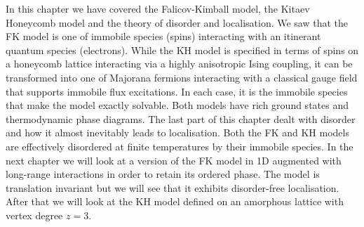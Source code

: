 In this chapter we have covered the Falicov-Kimball model, the Kitaev Honeycomb model and the theory of disorder and localisation. We saw that the FK model is one of immobile species (spins) interacting with an itinerant quantum species (electrons). While the KH model is specified in terms of spins on a honeycomb lattice interacting via a highly anisotropic Ising coupling, it can be transformed into one of Majorana fermions interacting with a classical gauge field that supports immobile flux excitations. In each case, it is the immobile species that make the model exactly solvable. Both models have rich ground states and thermodynamic phase diagrams. The last part of this chapter dealt with disorder and how it almost inevitably leads to localisation. Both the FK and KH models are effectively disordered at finite temperatures by their immobile species. In the next chapter we will look at a version of the FK model in 1D augmented with long-range interactions in order to retain its ordered phase. The model is translation invariant but we will see that it exhibits disorder-free localisation. After that we will look at the KH model defined on an amorphous lattice with vertex degree \(z=3\).
